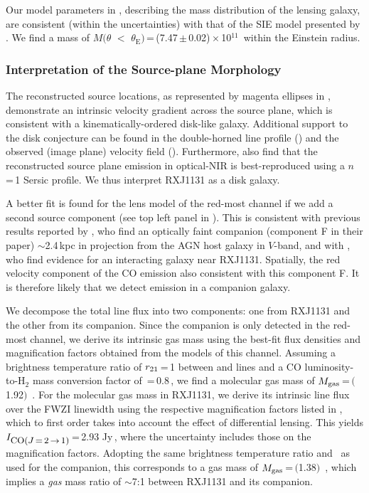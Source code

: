 \documentclass[]{emulateapj}
\begin{document}
Our model parameters in , describing
the mass distribution of the lensing galaxy, are consistent (within the uncertainties)
with that of the SIE model presented by . We find a mass of
$M(\theta$\,\,$<$\,\,$\theta_\textrm{E})$\,=\,(7.47\,$\pm$\,0.02)\,$\times$\,10$^{11}$\,\Msun
within the Einstein radius.

\subsubsection{Interpretation of the Source-plane Morphology} \label{sec:caveat}
The reconstructed source locations, as represented by magenta ellipses in , demonstrate
an intrinsic velocity gradient across the source plane, which is
consistent with a kinematically-ordered disk-like galaxy.
Additional support to the disk conjecture
can be found in the double-horned line profile ()
and the observed (image plane) velocity field (). Furthermore,
 also find that the reconstructed source plane emission in optical-NIR
is best-reproduced using a $n$\,=\,1 Sersic profile.
We thus interpret RXJ1131 as a disk galaxy.

A better fit is found for the lens model of
the red-most channel if we add a second source component (see
top left panel in ). This is consistent with previous results
reported by \citet[hereafter B08]{Brewer08a}, who find an optically faint companion
(component F in their paper) $\sim$2.4\,kpc in projection from the AGN host galaxy in $V$-band,
and with , who find evidence for an interacting galaxy near RXJ1131.
Spatially, the red velocity component of the CO emission
also consistent with this component F. It is therefore likely that we
detect \bco emission in a companion galaxy.

We decompose the total line flux into two components:
one from RXJ1131 and the other from its companion.
Since the companion is only detected in the red-most channel, we
derive its intrinsic gas mass using the best-fit flux
densities and magnification factors obtained from the models of this channel.
Assuming a brightness temperature ratio
of $r_{\rm 21}$\,=\,1 between \bco and \aco lines and
a CO luminosity-to-H$_2$ mass conversion factor of
\alphaco\,=\,0.8\,\alphaU, we find
a molecular gas mass of $M_{\rm gas}$\,=\,$($1.92$)$\, \Msun.
For the molecular gas mass in RXJ1131, we derive
its intrinsic line flux over the FWZI linewidth
using the respective magnification
factors listed in , which to
first order takes into account the effect of differential lensing.
This yields $I_{\small \mbox{CO($J$\,=\,2\,$\rightarrow$\,1)}}$\,=\,2.93 Jy\,\kms,
where the uncertainty includes those on
the magnification factors.
Adopting the same brightness temperature ratio and \alphaco\ as
used for the companion, this corresponds to a gas mass of
$M_{\rm gas}$\,=\,$($1.38$)$\, \Msun, which
implies a {\em gas} mass ratio of $\sim$7:1 between RXJ1131 and its companion.
\end{document}
